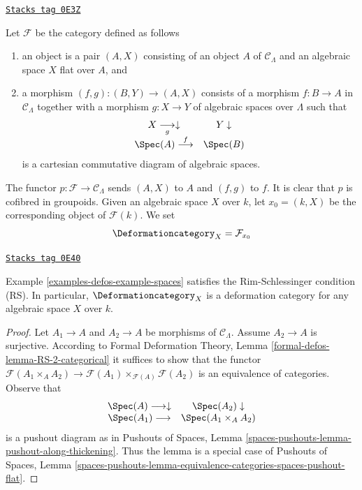 \begin{example}

\label{examples-defos-example-spaces}
\href{https://stacks.math.columbia.edu/tag/0E3Z}{\texttt{Stacks tag 0E3Z}}

Let $\mathcal{F}$ be the category defined as follows
\begin{enumerate}
\item an object is a pair $(A, X)$ consisting of an
object $A$ of $\mathcal{C}_\Lambda$ and an algebraic space
$X$ flat over $A$, and
\item a morphism $(f, g) : (B, Y) \to (A, X)$ consists of
a morphism $f : B \to A$ in $\mathcal{C}_\Lambda$ together
with a morphism $g : X \to Y$ of algebraic spaces over $\Lambda$
such that
$$
\begin{array}{cc}X \underset{g}{\longrightarrow}\downarrow & Y \downarrow \\ \Spec(A) \overset{f}{\longrightarrow} & \Spec(B)\end{array}
$$
is a cartesian commutative diagram of algebraic spaces.
\end{enumerate}
The functor $p : \mathcal{F} \to \mathcal{C}_\Lambda$ sends $(A, X)$
to $A$ and $(f, g)$ to $f$. It is clear that $p$ is cofibred in groupoids.
Given an algebraic space $X$ over $k$, let
$x_0 = (k, X)$ be the corresponding object of $\mathcal{F}(k)$. We set
$$
\Deformationcategory_X = \mathcal{F}_{x_0}
$$
\end{example}

\begin{lemma}[Spaces RS]
\label{examples-defos-lemma-spaces-RS}
\href{https://stacks.math.columbia.edu/tag/0E40}{\texttt{Stacks tag 0E40}}

Example \ref{examples-defos-example-spaces}
satisfies the Rim-Schlessinger condition (RS).
In particular, $\Deformationcategory_X$ is a deformation category
for any algebraic space $X$ over $k$.
\end{lemma}

\begin{proof}
Let $A_1 \to A$ and $A_2 \to A$ be morphisms of $\mathcal{C}_\Lambda$.
Assume $A_2 \to A$ is surjective. According to
Formal Deformation Theory, Lemma
\ref{formal-defos-lemma-RS-2-categorical}
it suffices to show that the functor
$\mathcal{F}(A_1 \times_A A_2) \to
\mathcal{F}(A_1) \times_{\mathcal{F}(A)} \mathcal{F}(A_2)$
is an equivalence of categories.
Observe that
$$
\begin{array}{cc}\Spec(A) \longrightarrow\downarrow & \Spec(A_2) \downarrow \\ \Spec(A_1) \longrightarrow & \Spec(A_1 \times_A A_2)\end{array}
$$
is a pushout diagram as in Pushouts of Spaces, Lemma
\ref{spaces-pushouts-lemma-pushout-along-thickening}.
Thus the lemma is a special case of Pushouts of Spaces, Lemma
\ref{spaces-pushouts-lemma-equivalence-categories-spaces-pushout-flat}.
\end{proof}

